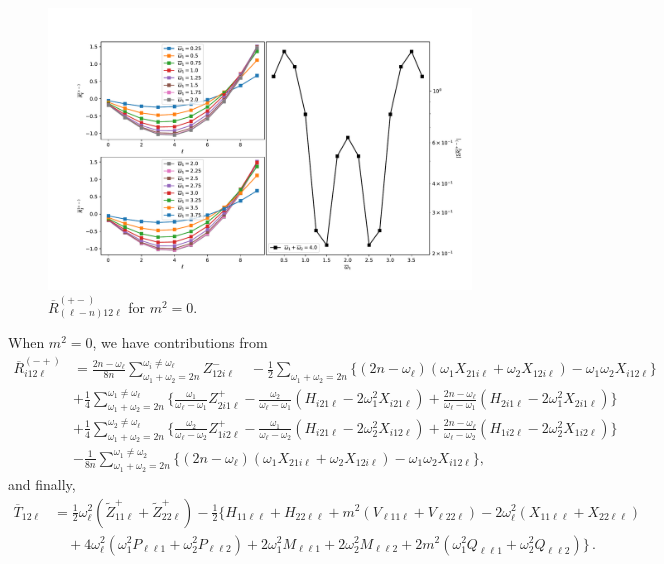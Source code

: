 \documentclass[letterpaper,11pt]{article}
\newcommand{\oi}{\omega_i}
\newcommand{\ol}{\omega_\ell}
\newcommand{\oone}{\omega_1}
\newcommand{\otwo}{\omega_2}
\begin{document}
\begin{figure}
\centering
	\includegraphics[width=\textwidth]{./figures/NN_equalfreq_pmchannel_n2_m0_0}
	\caption{$\overline{R}^{(+-)}_{(\ell - n)12\ell}$ for $m^2 = 0$.}
\end{figure}

When $m^2 = 0$, we have contributions from
\begin{align}
\label{R3}
\overline{R}_{i12\ell}^{(-+)} &= \frac{2n-\ol}{8n} \sum_{\oone + \otwo = 2n}^{\oi \neq \ol} Z^-_{12i\ell} \quad - \frac{1}{2} \sum_{\oone + \otwo = 2n} \Big\{ (2n - \ol)\left(\oone X_{21i\ell} + \otwo X_{12i\ell} \right) - \oone \otwo X_{i12\ell} \Big\} \nonumber \\
%
& + \frac{1}{4} \sum_{\oone + \otwo = 2n}^{\oone \neq \ol} \Big\{ \frac{\oone}{\ol - \oone} Z^+_{2i1\ell} - \frac{\otwo}{\ol - \oone} \left(H_{i21\ell} - 2\oone^2 X_{i21\ell} \right) + \frac{2n - \ol}{\ol - \oone} \left( H_{2i1\ell} - 2\oone^2 X_{2i1\ell} \right) \Big\} \nonumber \\
%
& + \frac{1}{4} \sum_{\oone + \otwo = 2n}^{\otwo \neq \ol} \Big\{ \frac{\otwo}{\ol-\otwo} Z^+_{1i2\ell} - \frac{\oone}{\ol-\otwo}\left(H_{i21\ell} - 2\otwo^2 X_{i12\ell} \right) + \frac{2n - \ol}{\ol - \otwo} \left( H_{1i2\ell} - 2\otwo^2 X_{1i2\ell} \right) \Big\} \nonumber \\
%
& - \frac{1}{8n} \sum_{\oone + \otwo = 2n}^{\oone \neq \otwo} \Big\{ (2n - \ol) \left(\oone X_{21i\ell} + \otwo X_{12i\ell} \right) - \oone \otwo X_{i12\ell} \Big\} ,
\end{align}
and finally, 
\begin{align}
\label{T12}
\overline{T}_{12\ell} &=  \frac{1}{2} \ol^2 \left( \tilde{Z}^+_{11\ell} + \tilde{Z}^+_{22\ell} \right)- \frac{1}{2} \Big\{ H_{11\ell\ell} + H_{22\ell\ell} + m^2 \left( V_{\ell 1 1 \ell} + V_{\ell 2 2 \ell} \right) - 2 \ol^2 \left( X_{11\ell\ell} + X_{22\ell\ell} \right)  \nonumber \\
%
& \quad + 4 \ol^2 \left( \oone^2 P_{\ell \ell 1} + \otwo^2 P_{\ell \ell 2} \right) + 2\oone^2 M_{\ell \ell 1} + 2\otwo^2 M_{\ell \ell 2} + 2m^2 \left( \oone^2 Q_{\ell\ell 1} + \otwo^2 Q_{\ell \ell 2} \right) \Big\} \, .
\end{align}
\end{document}
